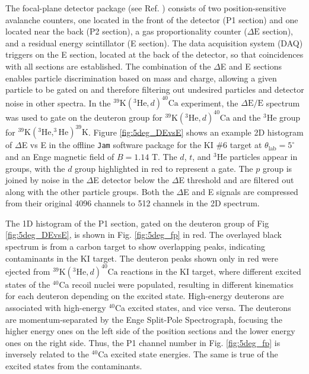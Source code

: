 The focal-plane detector package (see Ref. \cite{Marshall2019}) consists of two position-sensitive avalanche counters, one located in the front of the detector (P1 section) and one located near the back (P2 section), a gas proportionality counter ($\Delta\mathrm{E}$ section), and a residual energy scintillator (E section). The data acquisition system (DAQ) triggers on the E section, located at the back of the detector, so that coincidences with all sections are established. The combination of the $\Delta$E and E sections enables particle discrimination based on mass and charge, allowing a given particle to be gated on and therefore filtering out undesired particles and detector noise in other spectra. In the $^{39}\mathrm{K}(^{3}\mathrm{He},d)^{40}\mathrm{Ca}$ experiment, the $\Delta\mathrm{E}/\mathrm{E}$ spectrum was used to gate on the deuteron group for $^{39}\mathrm{K}(^{3}\mathrm{He},d)^{40}\mathrm{Ca}$ and the $^{3}\mathrm{He}$ group for $^{39}\mathrm{K}(^{3}\mathrm{He},^{3}\mathrm{He})^{39}\mathrm{K}$. Figure \ref{fig:5deg_DEvsE} shows an example 2D histogram of $\Delta$E vs E in the offline \texttt{Jam} software package \cite{Swartz2001,Jam} for the KI $\#$6 target at $\theta_{\mathrm{lab}} = 5^{\circ}$ and an Enge magnetic field of $B = 1.14$ T. The $d$, $t$, and $^{3}$He particles appear in groups, with the $d$ group highlighted in red to represent a gate. The $p$ group is joined by noise in the $\Delta$E detector below the $\Delta$E threshold and are filtered out along with the other particle groups. Both the $\Delta$E and E signals are compressed from their original 4096 channels to 512 channels in the 2D spectrum. 

The 1D histogram of the P1 section, gated on the deuteron group of Fig \ref{fig:5deg_DEvsE}, is shown in Fig. \ref{fig:5deg_fp} in red. The overlayed black spectrum is from a carbon target to show overlapping peaks, indicating contaminants in the KI target. The deuteron peaks shown only in red were ejected from $^{39}\mathrm{K}(^{3}\mathrm{He},d)^{40}\mathrm{Ca}$ reactions in the KI target, where different excited states of the $^{40}$Ca recoil nuclei were populated, resulting in different kinematics for each deuteron depending on the excited state. High-energy deuterons are associated with high-energy $^{40}$Ca excited states, and vice versa. The deuterons are momentum-separated by the Enge Split-Pole Spectrograph, focusing the higher energy ones on the left side of the position sections and the lower energy ones on the right side. Thus, the P1 channel number in Fig. \ref{fig:5deg_fp} is inversely related to the $^{40}$Ca excited state energies. The same is true of the excited states from the contaminants.

